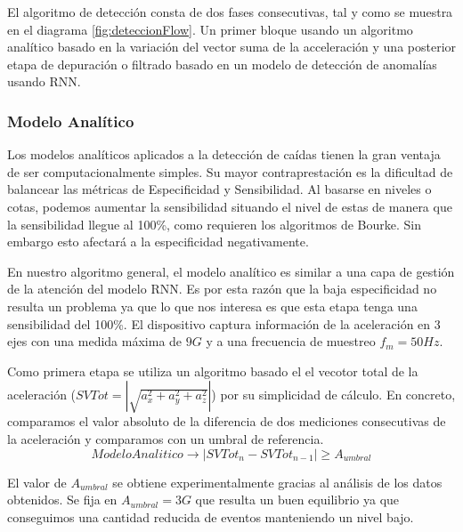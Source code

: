 \documentclass[../tfm.tex]{subfiles}
\begin{document}
El algoritmo de detección consta de dos fases consecutivas, tal y como se muestra en el diagrama \ref{fig:deteccionFlow}. Un primer bloque usando un algoritmo analítico basado en la variación del vector suma de la acceleración y una posterior etapa de depuración o filtrado basado en un modelo de detección de anomalías usando RNN.


\subsubsection{Modelo Analítico}

Los modelos analíticos aplicados a la detección de caídas tienen la gran ventaja de ser computacionalmente simples. Su mayor contraprestación es la dificultad de balancear las métricas de Especificidad y Sensibilidad. Al basarse en niveles o cotas, podemos aumentar la sensibilidad situando el nivel de estas de manera que la sensibilidad llegue al 100\%, como requieren los algoritmos de Bourke\cite{Bourke2006}. Sin embargo esto afectará a la especificidad negativamente\cite{Aziz2017}.


En nuestro algoritmo general, el modelo analítico es similar a una capa de gestión de la atención del modelo RNN. Es por esta razón que la baja especificidad  no resulta un problema ya que lo que nos interesa es que esta etapa tenga una sensibilidad del 100\%. El dispositivo captura información de la aceleración en 3 ejes con una medida máxima de $9G$ y a una frecuencia de muestreo $f_m=50Hz$.

Como primera etapa se utiliza un algoritmo basado el el vecotor total de la aceleración ($SVTot = |\sqrt{a_{x}^2+a_{y}^2+a_{z}^2}|$) por su simplicidad de cálculo. En concreto, comparamos el valor absoluto de la diferencia de dos mediciones consecutivas de la aceleración y comparamos con un umbral de referencia.
\[
ModeloAnalitico\rightarrow |SVTot_n - SVTot_{n-1}|\geq A_{umbral}
\]

El valor de $A_{umbral}$ se obtiene experimentalmente gracias al análisis de los datos obtenidos. Se fija en $A_{umbral} = 3G$ que resulta un buen equilibrio ya que conseguimos una cantidad reducida de eventos manteniendo un nivel bajo. 
\end{document}
